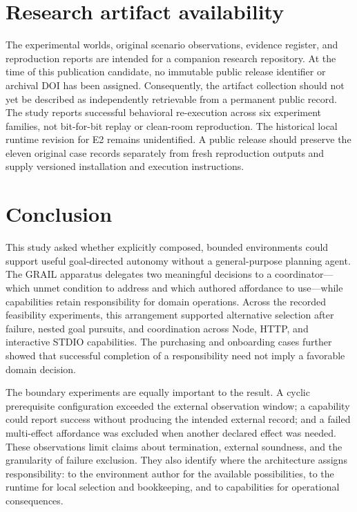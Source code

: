 \documentclass[11pt]{article}
\begin{document}
\section{Research artifact availability}
The experimental worlds, original scenario observations, evidence register, and reproduction reports are intended for a companion research repository. At the time of this publication candidate, no immutable public release identifier or archival DOI has been assigned. Consequently, the artifact collection should not yet be described as independently retrievable from a permanent public record. The study reports successful behavioral re-execution across six experiment families, not bit-for-bit replay or clean-room reproduction. The historical local runtime revision for E2 remains unidentified. A public release should preserve the eleven original case records separately from fresh reproduction outputs and supply versioned installation and execution instructions.

\section{Conclusion}
This study asked whether explicitly composed, bounded environments could support useful goal-directed autonomy without a general-purpose planning agent. The GRAIL apparatus delegates two meaningful decisions to a coordinator---which unmet condition to address and which authored affordance to use---while capabilities retain responsibility for domain operations. Across the recorded feasibility experiments, this arrangement supported alternative selection after failure, nested goal pursuits, and coordination across Node, HTTP, and interactive STDIO capabilities. The purchasing and onboarding cases further showed that successful completion of a responsibility need not imply a favorable domain decision.

The boundary experiments are equally important to the result. A cyclic prerequisite configuration exceeded the external observation window; a capability could report success without producing the intended external record; and a failed multi-effect affordance was excluded when another declared effect was needed. These observations limit claims about termination, external soundness, and the granularity of failure exclusion. They also identify where the architecture assigns responsibility: to the environment author for the available possibilities, to the runtime for local selection and bookkeeping, and to capabilities for operational consequences.
\end{document}
